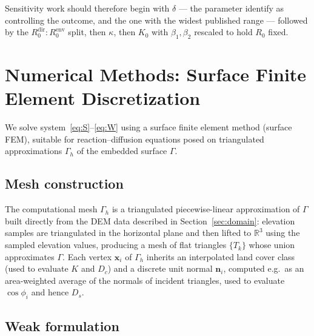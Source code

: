 \documentclass[11pt]{article}
\begin{document}
Sensitivity work should therefore begin with $\delta$ --- the parameter \citet{Almberg2011} identify as controlling the outcome, and the one with the widest published range --- followed by the $R_0^{\mathrm{dir}}:R_0^{\mathrm{env}}$ split, then $\kappa$, then $K_0$ with $\beta_1,\beta_2$ rescaled to hold $R_0$ fixed.

\section{Numerical Methods: Surface Finite Element Discretization}
\label{sec:fem}

We solve system~\eqref{eq:S}--\eqref{eq:W} using a surface finite element method (surface FEM), suitable for reaction--diffusion equations posed on triangulated approximations $\Gamma_h$ of the embedded surface $\Gamma$.

\subsection{Mesh construction}

The computational mesh $\Gamma_h$ is a triangulated piecewise-linear approximation of $\Gamma$ built directly from the DEM data described in Section~\ref{sec:domain}: elevation samples are triangulated in the horizontal plane and then lifted to $\mathbb{R}^3$ using the sampled elevation values, producing a mesh of flat triangles $\{T_k\}$ whose union approximates $\Gamma$. Each vertex $\mathbf{x}_i$ of $\Gamma_h$ inherits an interpolated land cover class (used to evaluate $K$ and $D_c$) and a discrete unit normal $\mathbf{n}_i$, computed e.g.\ as an area-weighted average of the normals of incident triangles, used to evaluate $\cos\phi_i$ and hence $D_s$.

\subsection{Weak formulation}
\label{sec:weak}
\end{document}
